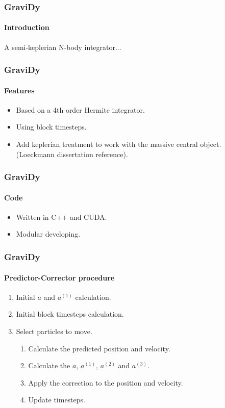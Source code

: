 \begin{frame}
    \frametitle{GraviDy}
    \framesubtitle{Introduction}
    \begin{center}
        A semi-keplerian N-body integrator...
    \end{center}
\end{frame}

\begin{frame}
    \frametitle{GraviDy}
    \framesubtitle{Features}
    \begin{itemize}
        \item Based on a 4th order Hermite integrator.
        \item Using block timesteps.
        \item Add keplerian treatment to work with the massive central object.
              (Loeckmann dissertation reference).
    \end{itemize}
\end{frame}

\begin{frame}
    \frametitle{GraviDy}
    \framesubtitle{Code}
    \begin{itemize}
        \item Written in C++ and CUDA.
        \item Modular developing.
    \end{itemize}
\end{frame}

\begin{frame}
    \frametitle{GraviDy}
    \framesubtitle{Predictor-Corrector procedure}
    \begin{enumerate}
        \item Initial $a$ and $a^{(1)}$ calculation.
        \item Initial block timesteps calculation.
        \item Select particles to move.
        \begin{enumerate}
            \item Calculate the predicted position and velocity.
            \item Calculate the $a$, $a^{(1)}$, $a^{(2)}$ and $a^{(3)}$.
            \item Apply the correction to the position and velocity.
            \item Update timesteps.
        \end{enumerate}
    \end{enumerate}
\end{frame}

